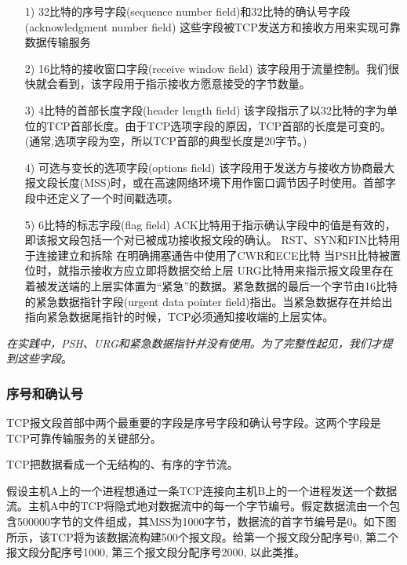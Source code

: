 \begin{itemize}
    \item [1)] 32比特的序号字段(sequence number field)和32比特的确认号字段(acknowledgment number field)
    \subitem 这些字段被TCP发送方和接收方用来实现可靠数据传输服务
    \item [2)] 16比特的接收窗口字段(receive window field)
    \subitem 该字段用于流量控制。我们很快就会看到，该字段用于指示接收方愿意接受的字节数量。
    \item [3)] 4比特的首部长度字段(header length field)
    \subitem 该字段指示了以32比特的字为单位的TCP首部长度。由于TCP选项字段的原因，TCP首部的长度是可变的。(通常,选项字段为空，所以TCP首部的典型长度是20字节。)
    \item [4)] 可选与变长的选项字段(options field)
    \subitem 该字段用于发送方与接收方协商最大报文段长度(MSS)时，或在高速网络环境下用作窗口调节因子时使用。首部字段中还定义了一个时间戳选项。
    \item [5)] 6比特的标志字段(flag field)
    \subitem [a] ACK比特用于指示确认字段中的值是有效的，即该报文段包括一个对已被成功接收报文段的确认。
    \subitem [b] RST、SYN和FIN比特用于连接建立和拆除
    \subitem [c] 在明确拥塞通告中使用了CWR和ECE比特
    \subitem [d] 当PSH比特被置位时，就指示接收方应立即将数据交给上层
    \subitem [e] URG比特用来指示报文段里存在着被发送端的上层实体置为“紧急”的数据。紧急数据的最后一个字节由16比特的紧急数据指针字段(urgent data pointer field)指出。当紧急数据存在并给出指向紧急数据尾指针的时候，TCP必须通知接收端的上层实体。
\end{itemize}

    \emph{在实践中，PSH、URG和紧急数据指针并没有使用。为了完整性起见，我们才提到这些字段}。

\subsubsection{序号和确认号}

    TCP报文段首部中两个最重要的字段是序号字段和确认号字段。这两个字段是TCP可靠传输服务的关键部分。

    TCP把数据看成一个无结构的、有序的字节流。

    假设主机A上的一个进程想通过一条TCP连接向主机B上的一个进程发送一个数据流。主机A中的TCP将隐式地对数据流中的每一个字节编号。假定数据流由一个包含500000字节的文件组成，其MSS为1000字节，数据流的首字节编号是0。如下图所示，该TCP将为该数据流构建500个报文段。给第一个报文段分配序号0, 第二个报文段分配序号1000, 第三个报文段分配序号2000, 以此类推。

